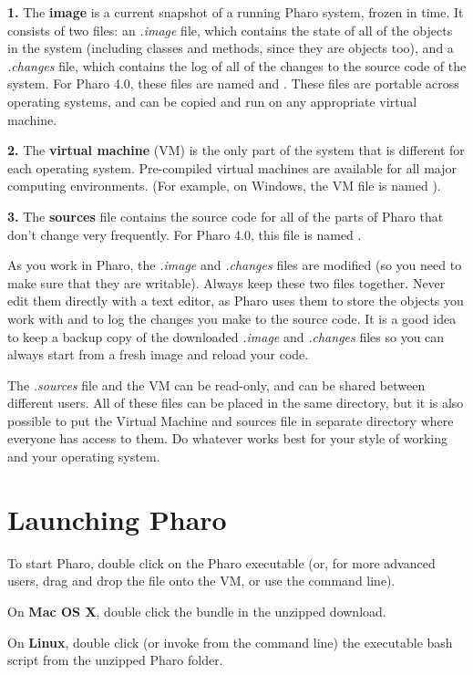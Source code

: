 \documentclass[a4paper,10pt,twoside]{book}
\begin{document}
\textbf{1.} The \textbf{image} is a current snapshot of a running Pharo system, frozen in
time. It consists of two files: an \textit{.image} file, which contains the state of
all of the objects in the system (including classes and methods, since they are
objects too), and a \textit{.changes} file, which contains the log of all of the
changes to the source code of the system. For Pharo 4.0, these files are named
 and . These files are portable across
operating systems, and can be copied and run on any appropriate virtual machine.

\textbf{2.} The \textbf{virtual machine} (VM) is the only part of the system that is
different for each operating system. Pre-compiled virtual machines are available
for all major computing environments. (For example, on Windows, the VM file is
named ).

\textbf{3.} The \textbf{sources} file contains the source code for all of the parts of
Pharo that don't change very frequently. For Pharo 4.0, this file is named
.

As you work in Pharo, the \textit{.image} and \textit{.changes} files are modified (so you
need to make sure that they are writable). Always keep these two files together.
Never edit them directly with a text editor, as Pharo uses them to store the
objects you work with and to log the changes you make to the source code. It is
a good idea to keep a backup copy of the downloaded \textit{.image} and \textit{.changes}
files so you can always start from a fresh image and reload your code.

The \textit{.sources} file and the VM can be read-only, and can be shared between
different users. All of these files can be placed in the same directory, but it
is also possible to put the Virtual Machine and sources file in separate
directory where everyone has access to them. Do whatever works best for your
style of working and your operating system.
\section{Launching Pharo}\label{Launching Pharo}
To start Pharo, double click on the Pharo executable (or, for more advanced
users, drag and drop the  file onto the VM, or use the command line).

On \textbf{Mac OS X}, double click the  bundle in the unzipped download.

On \textbf{Linux}, double click (or invoke from the command line) the 
executable bash script from the unzipped Pharo folder.
\end{document}
